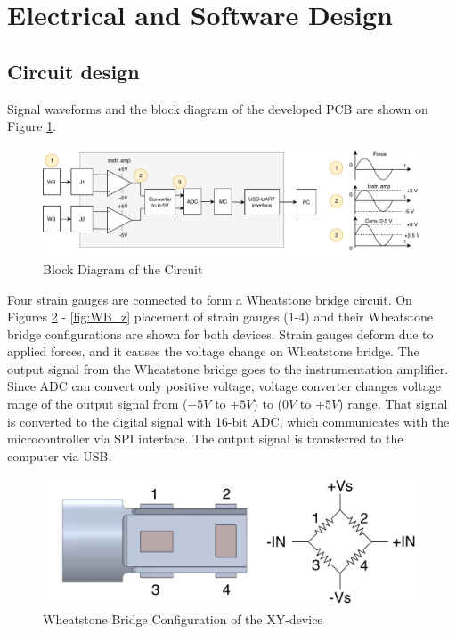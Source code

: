 \section{Electrical and Software Design}
\label{sec:elecDes}

	\subsection{Circuit design}
	\label{sec:cirDes}
	Signal waveforms and the block diagram of the developed PCB are shown on Figure \ref{fig:PCB_bd}.

\begin{figure}[h]
	\begin{center}
	\includegraphics[width=150mm]{fig/methods/PSC_block_wave.pdf}
	\end{center}
	\vspace{-4mm}
	\caption[Block Diagram of the Circuit]
	{Block Diagram of the Circuit}
	\label{fig:PCB_bd}
	\vspace{-2mm}
\end{figure}

Four strain gauges are connected to form a Wheatstone bridge circuit. On Figures \ref{fig:WB_xy_dev} - \ref{fig:WB_z} placement of strain gauges (1-4) and their Wheatstone bridge configurations are shown for both devices. Strain gauges deform due to applied forces, and it causes the voltage change on Wheatstone bridge. The output signal from the Wheatstone bridge goes to the instrumentation amplifier. Since ADC can convert only positive voltage, voltage converter changes voltage range of the output signal from ($-5V$ to $+5V$) to ($0V$ to $+5V$) range. That signal is converted to the digital signal with 16-bit ADC, which communicates with the microcontroller via SPI interface. The output signal is transferred to the computer via USB. 
	
\begin{figure}[h]
	\begin{center}
		\includegraphics[width=120mm]{fig/methods/Wiring_xy_sleeve.pdf}
	\end{center}
	\vspace{-4mm}
	\caption[Wheatstone Bridge Configuration of the XY-device]
	{Wheatstone Bridge Configuration of the XY-device}
	\label{fig:WB_xy_dev}
	\vspace{-2mm}
\end{figure}

